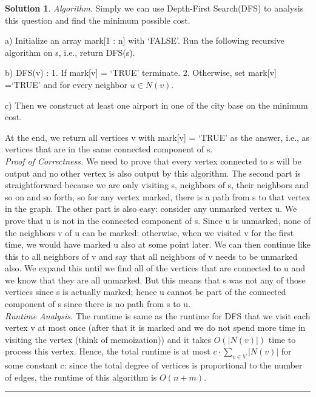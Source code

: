 \documentclass{article}
\theoremstyle{definition}
\def\fline{\rule{0.75\linewidth}{0.5pt}}
\newcommand{\finishline}{\begin{center}\fline\end{center}}
\newtheorem*{solution*}{Solution}
\newenvironment{solution}{\begin{solution*}}{{\finishline} \end{solution*}}
\begin{document}
\begin{solution}
	
	\emph{Algorithm.} Simply we can use Depth-First Search(DFS) to analysis this question and find the minimum possible cost. 
	
	a) Initialize an array mark[1 : n] with ‘FALSE’. Run the following recursive algorithm on s, i.e., return DFS(s). 
	
	b) DFS(v) : 1. If mark[v] = ‘TRUE’ terminate. 2. Otherwise, set mark[v] =‘TRUE’ and for every neighbor $u \in N(v)$. 
	
	c) Then we construct at least one airport in one of the city base on the minimum cost. 
	
	At the end, we return all vertices v with mark[v] = ‘TRUE’ as the answer, i.e., as vertices that are in the same connected component of s. \\

	\emph{Proof of Correctness.} We need to prove that every vertex connected to s will be output and no other vertex is also output by this algorithm. The second part is straightforward because we are only visiting s, neighbors of s, their neighbors and so on and so forth, so for any vertex marked, there is a path from s to that vertex in the graph. The other part is also easy: consider any unmarked vertex u. We prove that u is not in the connected component of s. Since u is unmarked, none of the neighbors v of u can be marked: otherwise, when we visited v for the first time, we would have marked u also at some point later. We can then continue like this to all neighbors of v and say that all neighbors of v needs to be unmarked also. We expand this until we find all of the vertices that are connected to u and we know that they are all unmarked. But this means that s was not any of those vertices since s is actually marked; hence u cannot be part of the connected component of s since there is no path from s to u. \\
	
	\emph{Runtime Analysis.} The runtime is same as the runtime for DFS that we visit each vertex v at most once (after that it is marked and we do not spend more time in visiting the vertex (think of memoization)) and it takes $O(\left| N(v) \right|)$ time to process this vertex. Hence, the total runtime is at most $c · \sum _{v \in V} |N(v)|$ for some constant c: since the total degree of vertices is proportional to the number of edges, the runtime of this algorithm is $O(n + m)$.


\end{solution}
\end{document}
